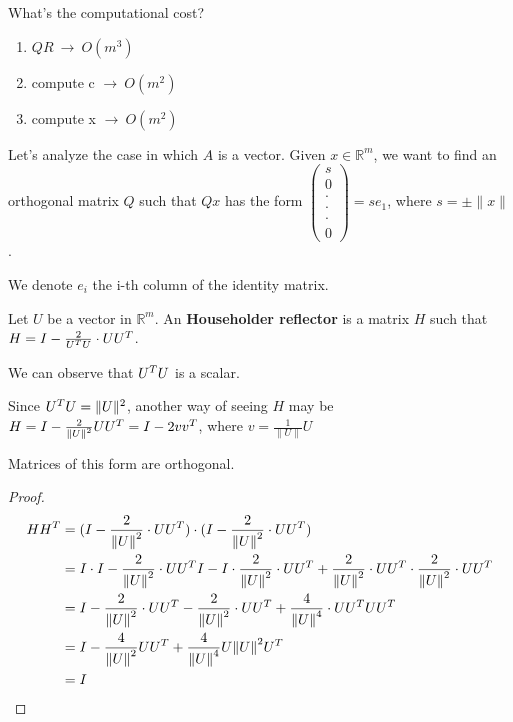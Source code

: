 \documentclass[computationalMathematics.tex]{subfiles}
\begin{document}
What's the computational cost?
\begin{enumerate}
  \item $QR ~ \rightarrow ~ O({m}^{3})$
  \item compute c $\rightarrow ~ O({m}^{2})$
  \item compute x $ \rightarrow ~ O({m}^{2})$
\end{enumerate}

Let's analyze the case in which $A$ is a vector. Given $x \in \mathds{R}^m$, we want to find an orthogonal matrix $Q$ such that $Qx$ has the form $\begin{pmatrix}s\\0\\ \cdot\\ \cdot\\ \cdot\\ 0\end{pmatrix} = se_{1}$, where $s= \pm \|x\|$.
  
  We denote $e_{i}$ the i-th column of the identity matrix.

\begin{definition}
  Let $U$ be a vector in $\mathds{R}^m$. An \textbf{Householder reflector} is a matrix $H$ such that $H = I - \frac{2}{{U}^{T}U} \cdot U {U}^{T}$.
  
  We can observe that ${U}^{T}U$ is a scalar.

    Since ${U}^{T}U = \|U\|^2$, another way of seeing $H$ may be $H = I - \frac{2}{{\|U\|}^{2}} U {U}^{T} = I - 2v {v}^{T}$, where $v = \frac{1}{\|U\|}U$

  
  \end{definition}
\begin{lemma}
  Matrices of this form are orthogonal.
\end{lemma}

\begin{proof}
  \begin{equation}
    \begin{split}
      H{H}^{T} & = (I-\frac{2}{{\|U\|}^{2}} \cdot U {U}^{T}) \cdot (I-\frac{2}{{\|U\|}^{2}} \cdot U {U}^{T})\\
      & = I\cdot I - \frac{2}{{\left\lVert U\right\rVert}^2} \cdot U {U}^{T} I-I \cdot \frac{2}{{\left\lVert U\right\rVert}^2} \cdot U {U}^{T} + \frac{2}{{\left\lVert U\right\rVert}^2} \cdot U {U}^{T} \cdot \frac{2}{{\left\lVert U\right\rVert}^2} \cdot U {U}^{T}\\
      & = I - \frac{2}{{\left\lVert U\right\rVert}^2} \cdot U {U}^{T} - \frac{2}{{\left\lVert U\right\rVert}^2} \cdot U {U}^{T} + \frac{4}{{\|U\|}^{4}} \cdot U{U}^{T} U {U}^{T}\\
      & = I - \frac{4}{{\left\lVert U\right\rVert}^2} U {U}^{T} + \frac{4}{{\|U\|}^{4}} U {\|U\|}^{2} {U}^{T}\\
      & = I
    \end{split}
  \end{equation}
\end{proof}
\end{document}
